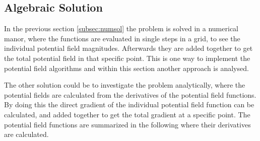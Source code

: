 \subsection{Algebraic Solution}
In the previous section \ref{subsec:numsol} the problem is solved in a numerical manor, where the functions are evaluated in single steps in a grid, to see the individual potential field magnitudes. Afterwards they are added together to get the total potential field in that specific point. This is one way to implement the potential field algorithms and within this section another approach is analysed.

The other solution could be to investigate the problem analytically, where the potential fields are calculated from the derivatives of the potential field functions. By doing this the direct gradient of the individual potential field function can be calculated, and added together to get the total gradient at a specific point. The potential field functions are summarized in the following where their derivatives are calculated.

